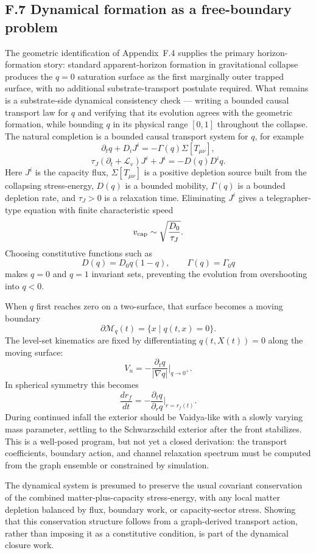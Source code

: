 \documentclass[11pt]{article}
\begin{document}
\subsection*{F.7 Dynamical formation as a free-boundary problem}

The geometric identification of Appendix~F.4 supplies the primary horizon-formation story: standard apparent-horizon formation in gravitational collapse produces the $q=0$ saturation surface as the first marginally outer trapped surface, with no additional substrate-transport postulate required. What remains is a substrate-side dynamical consistency check --- writing a bounded causal transport law for $q$ and verifying that its evolution agrees with the geometric formation, while bounding $q$ in its physical range $[0,1]$ throughout the collapse. The natural completion is a bounded causal transport system for $q$, for example
\[
\partial_t q+D_iJ^i=-\Gamma(q)\Sigma[T_{\mu\nu}],
\]
\[
\tau_J(\partial_t+\mathcal{L}_v)J^i+J^i=-D(q)D^i q.
\]
Here $J^i$ is the capacity flux, $\Sigma[T_{\mu\nu}]$ is a positive depletion source built from the collapsing stress-energy, $D(q)$ is a bounded mobility, $\Gamma(q)$ is a bounded depletion rate, and $\tau_J>0$ is a relaxation time. Eliminating $J^i$ gives a telegrapher-type equation with finite characteristic speed
\[
v_{\rm cap}\sim \sqrt{\frac{D_0}{\tau_J}}.
\]
Choosing constitutive functions such as
\[
D(q)=D_0q(1-q),
\qquad
\Gamma(q)=\Gamma_0q
\]
makes $q=0$ and $q=1$ invariant sets, preventing the evolution from overshooting into $q<0$.

When $q$ first reaches zero on a two-surface, that surface becomes a moving boundary
\[
\partial\mathcal{M}_q(t)=\{x\mid q(t,x)=0\}.
\]
The level-set kinematics are fixed by differentiating $q(t,X(t))=0$ along the moving surface:
\[
V_n=-\frac{\partial_t q}{|\nabla q|}\bigg|_{q\to0^+}.
\]
In spherical symmetry this becomes
\[
\frac{dr_f}{dt}
=
-\frac{\partial_t q}{\partial_r q}\bigg|_{r=r_f(t)}.
\]
During continued infall the exterior should be Vaidya-like with a slowly varying mass parameter, settling to the Schwarzschild exterior after the front stabilizes. This is a well-posed program, but not yet a closed derivation: the transport coefficients, boundary action, and channel relaxation spectrum must be computed from the graph ensemble or constrained by simulation.

The dynamical system is presumed to preserve the usual covariant conservation of the combined matter-plus-capacity stress-energy, with any local matter depletion balanced by flux, boundary work, or capacity-sector stress. Showing that this conservation structure follows from a graph-derived transport action, rather than imposing it as a constitutive condition, is part of the dynamical closure work.
\end{document}
